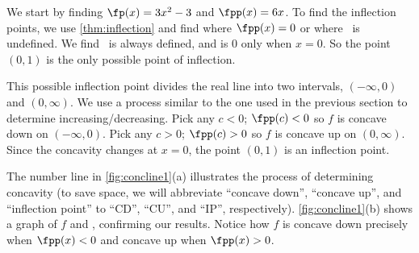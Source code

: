 {We start by finding $\fp(x)=3x^2-3$ and $\fpp(x)=6x$.  To find the inflection points, we use \autoref{thm:inflection} and find where $\fpp(x)=0$ or where \fpp\ is undefined. We find \fpp\ is always defined, and is 0 only when $x=0$. So the point $(0,1)$ is the only possible point of inflection.


This possible inflection point divides the real line into two intervals, $(-\infty,0)$ and $(0,\infty)$. We use a process similar to the one used in the previous section to determine increasing/decreasing. Pick any $c<0$; $\fpp(c)<0$ so $f$ is concave down on $(-\infty,0)$. Pick any $c>0$; $\fpp(c)>0$ so $f$ is concave up on $(0,\infty)$. Since the concavity changes at $x=0$, the point $(0,1)$ is an inflection point.

The number line in \autoref{fig:concline1}(a) illustrates the process of determining concavity (to save space, we will abbreviate ``concave down'', ``concave up'', and ``inflection point'' to ``CD'', ``CU'', and ``IP'', respectively). \autoref{fig:concline1}(b) shows a graph of $f$ and \fpp, confirming our results. Notice how $f$ is concave down precisely when $\fpp(x)<0$ and concave up when $\fpp(x)>0$.}

